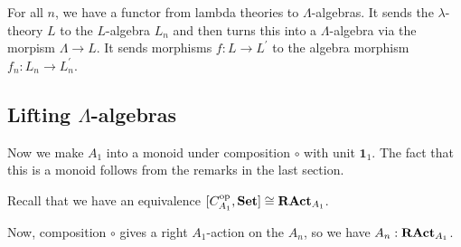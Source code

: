 \begin{definition}
  For all $ n $, we have a functor from lambda theories to $ \Lambda $-algebras. It sends the $ \lambda $-theory $ L $ to the $ L $-algebra $ L_n $ and then turns this into a $ \Lambda $-algebra via the morpism $ \Lambda \to L $. It sends morphisms $ f: L \to L^\prime $ to the algebra morphism $ f_n : L_n \to L^\prime_n $.
\end{definition}


\subsection{Lifting \texorpdfstring{$ \Lambda $}{Lambda}-algebras}

\begin{definition}
  Now we make $ A_1 $ into a monoid under composition $ \circ $ with unit $ \mathbf 1_1 $. The fact that this is a monoid follows from the remarks in the last section.
\end{definition}

Recall that we have an equivalence $ [C_{A_1}^{\text{op}}, \mathbf{Set}] \cong \mathbf{RAct}_{A_1} $.

\begin{definition}
  Now, composition $ \circ $ gives a right $ A_1 $-action on the $ A_n $, so we have $ A_n : \mathbf{RAct}_{A_1} $.
\end{definition}

